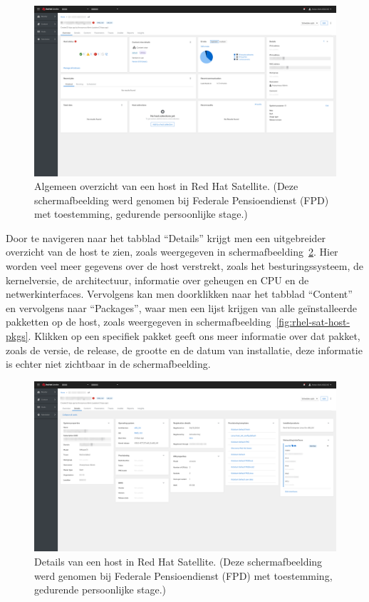 \begin{figure}[h!]
    \includegraphics[width=\textwidth]
    {./graphics/state-of-the-art/rhel-satellite/rhel-sat-host-overview.png}
    \caption[Algemeen overzicht van host in Satellite.]{\label{fig:rhel-sat-host-overview}Algemeen overzicht van een host in Red Hat Satellite. (Deze schermafbeelding werd genomen bij Federale Pensioendienst (FPD) met toestemming, gedurende persoonlijke stage.)}
\end{figure}

Door te navigeren naar het tabblad ``Details'' krijgt men een uitgebreider overzicht van de host te zien, zoals weergegeven in schermafbeelding~\ref{fig:rhel-sat-host-details}.
Hier worden veel meer gegevens over de host verstrekt, zoals het besturingssysteem, de kernelversie, de architectuur, informatie over geheugen en CPU en de netwerkinterfaces.
Vervolgens kan men doorklikken naar het tabblad ``Content'' en vervolgens naar ``Packages'', waar men een lijst krijgen van alle ge\"installeerde pakketten op de host, zoals weergegeven in schermafbeelding~\ref{fig:rhel-sat-host-pkgs}.
Klikken op een specifiek pakket geeft ons meer informatie over dat pakket, zoals de versie, de release, de grootte en de datum van installatie, deze informatie is echter niet zichtbaar in de schermafbeelding.

\begin{figure}[h!]
    \includegraphics[width=\textwidth]
    {./graphics/state-of-the-art/rhel-satellite/rhel-sat-host-details.png}
    \caption[Details van host in Red Hat Satellite.]{\label{fig:rhel-sat-host-details}Details van een host in Red Hat Satellite. (Deze schermafbeelding werd genomen bij Federale Pensioendienst (FPD) met toestemming, gedurende persoonlijke stage.)}
\end{figure}

